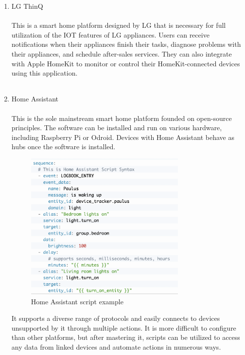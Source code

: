 \begin{enumerate}[label=\alph*]
    \item LG ThinQ\\
        \\
          This is a smart home platform designed by LG that is necessary for full utilization of the IOT features of LG appliances. Users can receive notifications when their appliances finish their tasks, diagnose problems with their appliances, and schedule after-sales services. They can also integrate with Apple HomeKit to monitor or control their HomeKit-connected devices using this application.\\\\


    \item Home Assistant\\
        \\
          This is the sole mainstream smart home platform founded on open-source principles. The software can be installed and run on various hardware, including Raspberry Pi or Odroid. Devices with Home Assistant behave as hubs once the software is installed.\\

          \begin{figure}[ht]
              \begin{center}
                  \raggedleft
                  \includegraphics[width=8cm]{imgs/introduction/ha_script_example.png}
                  \caption{Home Assistant script example}
                  \renewcommand{\thefigure}{\thesubsection.\arabic{figure}}
              \end{center}
          \end{figure}

          It supports a diverse range of protocols and easily connects to devices unsupported by it through multiple actions. It is more difficult to configure than other platforms, but after mastering it, scripts can be utilized to access any data from linked devices and automate actions in numerous ways.\\


\end{enumerate}
